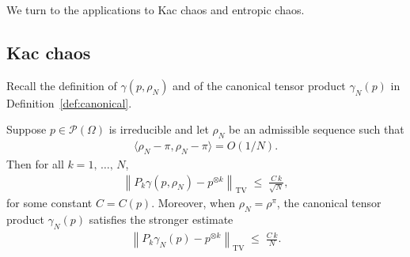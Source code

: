 \documentclass[AHL,Unicode,longabstracts,published]{cedram}
\renewcommand{\leq}{\;\leqslant\;}
\newcommand{\rhoN}{\rho^{\pi}}
\newcommand{\scalar}[2]{\langle #1, #2\rangle}
\newcommand{\tv}{\mathrm{TV}}
\newcommand{\cP}{\mathcal{P}}
\let\g=\gamma
\let\r=\rho
\let\O=\Omega
\begin{document}
We turn to the applications to Kac chaos and entropic chaos.

\subsection{Kac chaos}

Recall the definition of $\g(p,\r_N)$ and of the canonical tensor product $\g_N(p)$ in Definition~\ref{def:canonical}.

\begin{theo}\label{th:eqens}
Suppose $p\in\cP(\O)$ is irreducible and let $\r_N$ be an admissible sequence such that
\begin{align}\label{hypo10}
\scalar{\r_N-\pi}{\r_N-\pi} =O(1/N).
\end{align}
Then for all $k=1,\,\dots,\,N$,
\begin{align}\label{eq:chaos00}
\left\|P_k\g(p,\r_N)-p^{\otimes k}\right\|_\tv \leq \frac{C\,k}{\sqrt N},
\end{align}
for some constant $C=C(p)$. Moreover, when $\r_N=\rhoN$, the canonical tensor product $\g_N(p)$ satisfies the stronger estimate
\begin{align}\label{eq:chaos000}
\left\|P_k\g_N(p)-p^{\otimes k}\right\|_\tv \leq \frac{C\,k}{ N}.
\end{align}
\end{theo}
\end{document}
